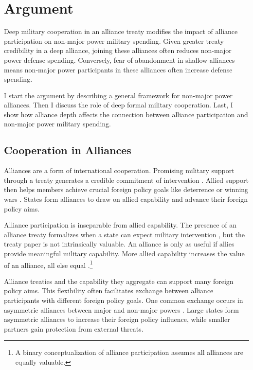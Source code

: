 \documentclass[12pt]{article}
\begin{document}
\section{Argument}

Deep military cooperation in an alliance treaty modifies the impact of alliance participation on non-major power military spending.
Given greater treaty credibility in a deep alliance, joining these alliances often reduces non-major power defense spending.
Conversely, fear of abandonment in shallow alliances means non-major power participants in these alliances often increase defense spending.  


I start the argument by describing a general framework for non-major power alliances. 
Then I discuss the role of deep formal military cooperation. 
Last, I show how alliance depth affects the connection between alliance participation and non-major power military spending. 


\subsection{Cooperation in Alliances}

Alliances are a form of international cooperation. 
Promising military support through a treaty generates a credible commitment of intervention \citep{Fearon1997, Morrow2000}. 
Allied support then helps members achieve crucial foreign policy goals like deterrence or winning wars \citep{Walt1990, Snyder1997}. 
States form alliances to draw on allied capability \citep{FordhamPoast2014} and advance their foreign policy aims.


Alliance participation is inseparable from allied capability. 
The presence of an alliance treaty formalizes when a state can expect military intervention \citep{Morrow2000}, but the treaty paper is not intrinsically valuable. 
An alliance is only as useful if allies provide meaningful military capability. 
More allied capability increases the value of an alliance, all else equal \citep{Johnsonetal2015}.\footnote{A binary conceptualization of alliance participation assumes all alliances are equally valuable.}


Alliance treaties and the capability they aggregate can support many foreign policy aims.
This flexibility often facilitates exchange between alliance participants with different foreign policy goals. 
One common exchange occurs in asymmetric alliances between major and non-major powers \citep{Morrow1991}. 
Large states form asymmetric alliances to increase their foreign policy influence, while smaller partners gain protection from external threats. 
\end{document}
